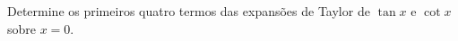 Determine os primeiros quatro termos das expansões de Taylor de $\tan x$ e $\cot x$ sobre $x = 0$.


